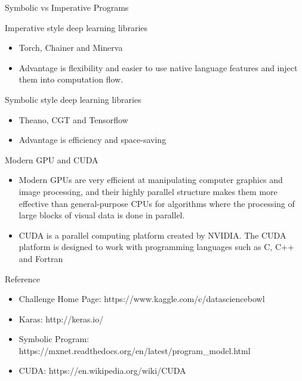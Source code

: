 \documentclass[mathserif]{beamer}
\begin{document}

\begin{frame}{Symbolic vs Imperative Programs}
\begin{block}{Imperative style deep learning libraries}
\begin{itemize}
\item Torch, Chainer and Minerva
\item Advantage is flexibility and easier to use native language features and inject them into computation flow.
\end{itemize}
\end{block}

\begin{block}{Symbolic style deep learning libraries}
\begin{itemize}
\item Theano, CGT and Tensorflow
\item Advantage is efficiency and space-saving
\end{itemize}
\end{block}
\end{frame}

\begin{frame}{Modern GPU and CUDA}
\begin{itemize}
\item Modern GPUs are very efficient at manipulating computer graphics and image processing, and their highly parallel structure makes them more effective than general-purpose CPUs for algorithms where the processing of large blocks of visual data is done in parallel.
\item CUDA is a parallel computing platform created by NVIDIA. The CUDA platform is designed to work with programming languages such as C, C++ and Fortran
\end{itemize}
\end{frame}

\begin{frame}{Reference}
\begin{itemize}
\item Challenge Home Page: https://www.kaggle.com/c/datasciencebowl
\item Karas: http://keras.io/
\item Symbolic Program: https://mxnet.readthedocs.org/en/latest/program\_model.html
\item CUDA: https://en.wikipedia.org/wiki/CUDA
\end{itemize}
\end{frame}
\end{document}
